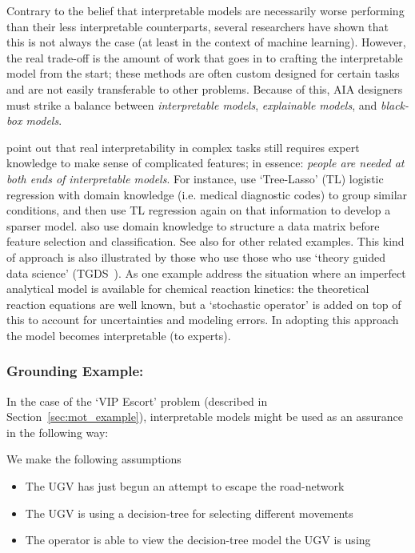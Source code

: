 Contrary to the belief that interpretable models are necessarily worse performing than their less interpretable counterparts, several researchers have shown that this is not always the case (at least in the context of machine learning). However, the real trade-off is the amount of work that goes in to crafting the interpretable model from the start; these methods are often custom designed for certain tasks and are not easily transferable to other problems. Because of this, AIA designers must strike a balance between \emph{interpretable models}, \emph{explainable models}, and \emph{black-box models}.

\citet{Park2016-ld} point out that real interpretability in complex tasks still requires expert knowledge to make sense of complicated features; in essence: \emph{people are needed at both ends of interpretable models}. For instance, \citet{Jovanovic2016-gw} use `Tree-Lasso' (TL) logistic regression with domain knowledge (i.e. medical diagnostic codes) to group similar conditions, and then use TL regression again on that information to develop a sparser model. \citet{Zycinski2012-jj} also use domain knowledge to structure a data matrix before feature selection and classification. See also \citet{Zhang2018-no,Khoa2018-gh} for other related examples. 
%
This kind of approach is also illustrated by those who use those who use `theory guided data science' (TGDS~\cite{Kumar2016-yw,Faghmous2014-og}). As one example \citet{Morrison2016-fz} address the situation where an imperfect analytical model is available for chemical reaction kinetics: the theoretical reaction equations are well known, but a `stochastic operator' is added on top of this to account for uncertainties and modeling errors. In adopting this approach the model becomes interpretable (to experts).

\subsubsection{Grounding Example:}
In the case of the `VIP Escort' problem (described in Section~\ref{sec:mot_example}), interpretable models might be used as an assurance in the following way:

We make the following assumptions

\begin{itemize}
    \item The UGV has just begun an attempt to escape the road-network
    \item The UGV is using a decision-tree for selecting different movements
    \item The operator is able to view the decision-tree model the UGV is using
\end{itemize}

